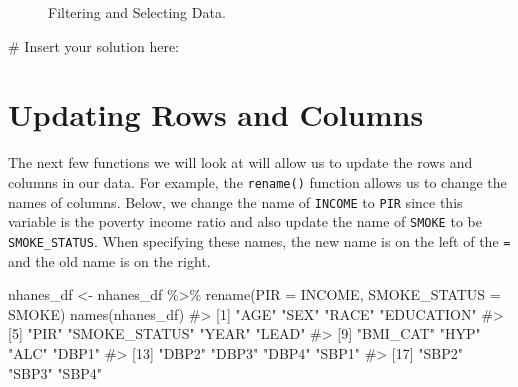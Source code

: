 \documentclass[
  letterpaper,
]{krantz}
\makeatletter
\newenvironment{Shaded}{\begin{snugshade}}{\end{snugshade}}
\newcommand{\AttributeTok}[1]{\textcolor[rgb]{0.40,0.45,0.13}{#1}}
\newcommand{\CommentTok}[1]{\textcolor[rgb]{0.37,0.37,0.37}{#1}}
\newcommand{\FunctionTok}[1]{\textcolor[rgb]{0.28,0.35,0.67}{#1}}
\newcommand{\NormalTok}[1]{\textcolor[rgb]{0.00,0.23,0.31}{#1}}
\newcommand{\OtherTok}[1]{\textcolor[rgb]{0.00,0.23,0.31}{#1}}
\newcommand{\SpecialCharTok}[1]{\textcolor[rgb]{0.37,0.37,0.37}{#1}}
\newenvironment{kframe}{%
\medskip{}
\setlength{\fboxsep}{.8em}
 \def\at@end@of@kframe{}%
 \ifinner\ifhmode%
  \def\at@end@of@kframe{\end{minipage}}%
  \begin{minipage}{\columnwidth}%
 \fi\fi%
 \def\FrameCommand##1{\hskip\@totalleftmargin \hskip-\fboxsep
 \colorbox{shadecolor}{##1}\hskip-\fboxsep
     \hskip-\linewidth \hskip-\@totalleftmargin \hskip\columnwidth}%
 \MakeFramed {\advance\hsize-\width
   \@totalleftmargin\z@ \linewidth\hsize
   \@setminipage}}%
 {\par\unskip\endMakeFramed%
 \at@end@of@kframe}
\renewenvironment{Shaded}{\begin{kframe}}{\end{kframe}}
\makeatother
\begin{document}
\begin{figure}


\caption{\label{fig-filtering-and-selecting}Filtering and Selecting
Data.}

\end{figure}%

\begin{Shaded}
\begin{Highlighting}[]
\CommentTok{\# Insert your solution here:}
\end{Highlighting}
\end{Shaded}

\section{Updating Rows and Columns}\label{updating-rows-and-columns}

The next few functions we will look at will allow us to update the rows
and columns in our data. For example, the \texttt{rename()} function
allows us to change the names of columns. Below, we change the name of
\texttt{INCOME} to \texttt{PIR} since this variable is the poverty
income ratio and also update the name of \texttt{SMOKE} to be
\texttt{SMOKE\_STATUS}. When specifying these names, the new name is on
the left of the \texttt{=} and the old name is on the right.

\begin{Shaded}
\begin{Highlighting}[]
\NormalTok{nhanes\_df }\OtherTok{\textless{}{-}}\NormalTok{ nhanes\_df }\SpecialCharTok{\%\textgreater{}\%} \FunctionTok{rename}\NormalTok{(}\AttributeTok{PIR =}\NormalTok{ INCOME, }\AttributeTok{SMOKE\_STATUS =}\NormalTok{ SMOKE)}
\FunctionTok{names}\NormalTok{(nhanes\_df)}
\CommentTok{\#\textgreater{}  [1] "AGE"          "SEX"          "RACE"         "EDUCATION"   }
\CommentTok{\#\textgreater{}  [5] "PIR"          "SMOKE\_STATUS" "YEAR"         "LEAD"        }
\CommentTok{\#\textgreater{}  [9] "BMI\_CAT"      "HYP"          "ALC"          "DBP1"        }
\CommentTok{\#\textgreater{} [13] "DBP2"         "DBP3"         "DBP4"         "SBP1"        }
\CommentTok{\#\textgreater{} [17] "SBP2"         "SBP3"         "SBP4"}
\end{Highlighting}
\end{Shaded}
\end{document}
